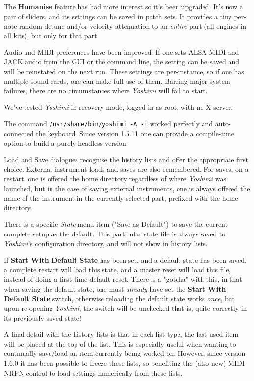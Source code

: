 \documentclass[
 11pt,
 twoside,
 a4paper,
 final                                 %
]{article}
\begin{document}
   The \textbf{Humanise} feature has had more interest so it's been upgraded.
   It's now a pair of sliders, and its settings can be saved in patch sets.
   It provides a tiny per-note random detune and/or velocity attenuation to
   an \textsl{entire} part (all engines in all kits), but only for that part.

   Audio and MIDI preferences have been improved. If one sets ALSA MIDI
   and JACK audio from the GUI or the command line, the setting can be
   saved and will be reinstated on the next run. These settings are
   per-instance, so if one has multiple sound cards, one can make full use of
   them.  Barring major system failures, there are no circumstances where
   \textsl{Yoshimi} will fail to start.

   We've tested \textsl{Yoshimi} in recovery mode, logged in as root, with
   no X server.

   The command \texttt{/usr/share/bin/yoshimi -A -i} worked perfectly and
   auto-connected the keyboard. Since version 1.5.11 one can provide a
   compile-time option to build a purely headless version.

   Load and Save dialogues recognise the history lists and offer
   the appropriate first choice. External instrument loads and saves are
   also remembered.
   For saves, on a restart, one is offered the home directory regardless
   of where \textsl{Yoshimi} was launched, but in the case of saving
   external instruments, one is always offered the name of the instrument
   in the currently selected part, prefixed with the home directory.

   There is a specific \textsl{State} menu item ("Save as Default") to save
   the current complete setup as the default. This particular state file is
   always saved to \textsl{Yoshimi}'s configuration directory, and will not
   show in history lists.

   If \textbf{Start With Default State} has been set, and a
   default state has been saved, a complete restart will load this state,
   and a master reset will load this file, instead of doing a
   first-time default reset.
   There is a "gotcha" with this, in that when saving the default state,
   one must \textsl{already} have set the \textbf{Start With Default State}
   switch, otherwise reloading the default state works \textsl{once}, but
   upon re-opening \textsl{Yoshimi}, the switch will be unchecked
   \textemdash that is, quite correctly in its previously saved state!

   A final detail with the history lists is that in each list type, the last
   used item will be placed at the top of the list. This is especially useful
   when wanting to continually save/load an item currently being worked on.
   However, since version 1.6.0 it has been possible to freeze these lists,
   so benefiting the (also new) MIDI NRPN control to load settings numerically
   from these lists.
\end{document}
